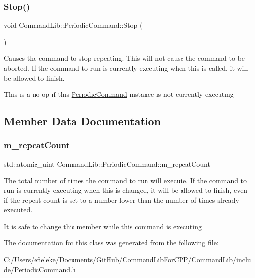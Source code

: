 \mbox{\label{class_command_lib_1_1_periodic_command_a59a83d1c32419d61d326040d7aa040ef}} 
\subsubsection{\texorpdfstring{Stop()}{Stop()}}
{\footnotesize\ttfamily void Command\+Lib\+::\+Periodic\+Command\+::\+Stop (\begin{DoxyParamCaption}{ }\end{DoxyParamCaption})}



Causes the command to stop repeating. This will not cause the command to be aborted. If the command to run is currently executing when this is called, it will be allowed to finish. 

This is a no-\/op if this \mbox{\hyperlink{class_command_lib_1_1_periodic_command}{Periodic\+Command}} instance is not currently executing

\subsection{Member Data Documentation}
\mbox{\label{class_command_lib_1_1_periodic_command_ab6e63dc1cc0fa2dc39eded7ca5f1fd94}} 
\subsubsection{\texorpdfstring{m\+\_\+repeat\+Count}{m\_repeatCount}}
{\footnotesize\ttfamily std\+::atomic\+\_\+uint Command\+Lib\+::\+Periodic\+Command\+::m\+\_\+repeat\+Count}



The total number of times the command to run will execute. If the command to run is currently executing when this is changed, it will be allowed to finish, even if the repeat count is set to a number lower than the number of times already executed. 

It is safe to change this member while this command is executing

The documentation for this class was generated from the following file\+:\begin{DoxyCompactItemize}
\item 
C\+:/\+Users/efieleke/\+Documents/\+Git\+Hub/\+Command\+Lib\+For\+C\+P\+P/\+Command\+Lib/include/Periodic\+Command.\+h\end{DoxyCompactItemize}
